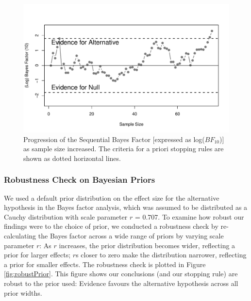 \documentclass[a4paper, doc, natbib]{apa6}
\begin{document}
\begin{figure}
\begin{center}
\includegraphics[width = \textwidth]{Images/bayesFactor.pdf}
\caption{Progression of the Sequential Bayes Factor [expressed as log($BF_{10}$)] as sample size increased. The criteria for a priori stopping rules are shown as dotted horizontal lines.}
\label{fig:bayesFactor}
\end{center}
\end{figure}


\subsubsection{Robustness Check on Bayesian Priors}
We used a default prior distribution on the effect size for the alternative hypothesis in the Bayes factor analysis, which was assumed to be distributed as a Cauchy distribution with scale parameter $r$ = 0.707. To examine how robust our findings were to the choice of prior, we conducted a robustness check by re-calculating the Bayes factor across a wide range of priors by varying scale parameter $r$: As $r$ increases, the prior distribution becomes wider, reflecting a prior for larger effects; $r$s closer to zero make the distribution narrower, reflecting a prior for smaller effects. The robustness check is plotted in Figure \ref{fig:robustPrior}. This figure shows our conclusions (and our stopping rule) are robust to the prior used: Evidence favours the alternative hypothesis across all prior widths.
\end{document}

